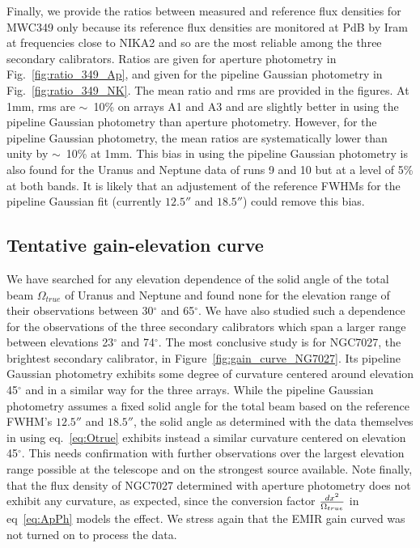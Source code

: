 Finally, we provide the ratios between measured and reference flux densities for MWC349 only because
its reference flux densities are monitored at PdB
       by Iram at frequencies close to NIKA2 and so are the most reliable among the three secondary calibrators.
       Ratios are given for aperture photometry in Fig.~\ref{fig:ratio_349_Ap}, and  given for
       the pipeline Gaussian photometry in Fig.~\ref{fig:ratio_349_NK}.
       The mean ratio and rms are provided in the figures. At 1mm, rms  are $\sim$~10\% on arrays A1 and A3 
       and are slightly better
       in using the pipeline Gaussian photometry than aperture photometry.
       However, for the  pipeline Gaussian photometry, the mean ratios are systematically lower than unity by $\sim$~10\% at 1mm.
        This bias in using the pipeline Gaussian photometry
       is also found for the Uranus and Neptune data of runs 9 and 10 but at a level of 5\% at both bands. It is likely that an adjustement
       of the reference FWHMs for the pipeline Gaussian fit (currently $12.5''$ and $18.5''$) could remove this bias.


\subsection{Tentative gain-elevation curve}


We have searched for any elevation dependence of the solid angle of the total beam  $\Omega_{true}$ of Uranus and Neptune
and found none for
the elevation range of their observations between  30$^{\circ}$ and 65$^{\circ}$.  We have also studied such a dependence
for the observations of the three secondary calibrators which span a larger range between elevations 23$^{\circ}$ and 74$^{\circ}$.
The most conclusive study is for NGC7027, the brightest secondary calibrator, in Figure~\ref{fig:gain_curve_NG7027}. 
Its pipeline Gaussian photometry exhibits some degree of curvature centered around elevation 45$^{\circ}$ and in a similar way
for the three arrays.
While the pipeline Gaussian photometry  assumes a fixed solid angle for the total beam based on the reference FWHM's $12.5''$ and $18.5''$,
the solid angle as determined with the data themselves in using
eq.~\ref{eq:Otrue} exhibits instead a similar curvature centered on elevation 45$^{\circ}$. This needs confirmation with further
observations  over the largest elevation range possible at the telescope and on the strongest source available. Note finally,
that the flux density of NGC7027 determined
with aperture photometry does not exhibit any curvature, as expected, since the conversion factor ${dx^2} \over {\Omega_{true}}$
in eq~\ref{eq:ApPh} models the effect.  We stress again that the EMIR gain curved was not turned on to process the data. 





